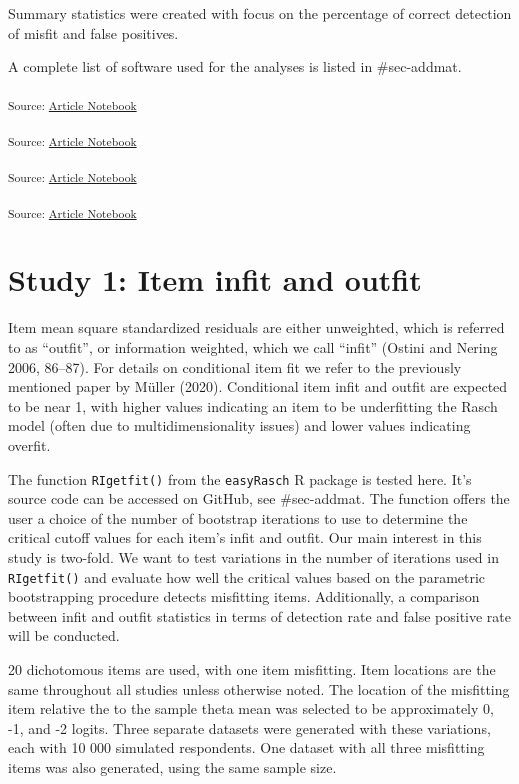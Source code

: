 \documentclass[
  letterpaper,
  DIV=11,
  numbers=noendperiod]{scrartcl}
\begin{document}
Summary statistics were created with focus on the percentage of correct
detection of misfit and false positives.

A complete list of software used for the analyses is listed in
\#sec-addmat.

\textsubscript{Source:
\href{https://pgmj.github.io/rasch_itemfit/index.qmd.html}{Article
Notebook}}

\textsubscript{Source:
\href{https://pgmj.github.io/rasch_itemfit/index.qmd.html}{Article
Notebook}}

\textsubscript{Source:
\href{https://pgmj.github.io/rasch_itemfit/index.qmd.html}{Article
Notebook}}

\textsubscript{Source:
\href{https://pgmj.github.io/rasch_itemfit/index.qmd.html}{Article
Notebook}}

\section{Study 1: Item infit and
outfit}\label{study-1-item-infit-and-outfit}

Item mean square standardized residuals are either unweighted, which is
referred to as ``outfit'', or information weighted, which we call
``infit'' (Ostini and Nering 2006, 86--87). For details on conditional
item fit we refer to the previously mentioned paper by Müller (2020).
Conditional item infit and outfit are expected to be near 1, with higher
values indicating an item to be underfitting the Rasch model (often due
to multidimensionality issues) and lower values indicating overfit.

The function \texttt{RIgetfit()} from the \texttt{easyRasch} R package
is tested here. It's source code can be accessed on GitHub, see
\#sec-addmat. The function offers the user a choice of the number of
bootstrap iterations to use to determine the critical cutoff values for
each item's infit and outfit. Our main interest in this study is
two-fold. We want to test variations in the number of iterations used in
\texttt{RIgetfit()} and evaluate how well the critical values based on
the parametric bootstrapping procedure detects misfitting items.
Additionally, a comparison between infit and outfit statistics in terms
of detection rate and false positive rate will be conducted.

20 dichotomous items are used, with one item misfitting. Item locations
are the same throughout all studies unless otherwise noted. The location
of the misfitting item relative the to the sample theta mean was
selected to be approximately 0, -1, and -2 logits. Three separate
datasets were generated with these variations, each with 10 000
simulated respondents. One dataset with all three misfitting items was
also generated, using the same sample size.
\end{document}
